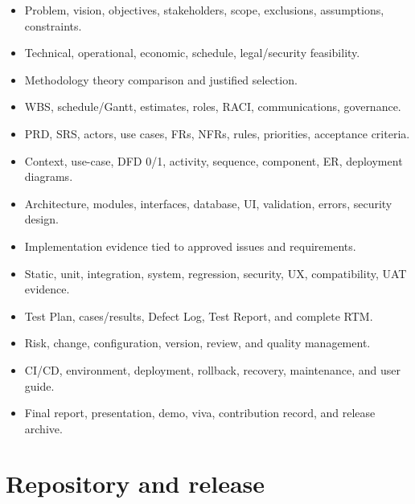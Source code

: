 \documentclass[
  10pt,
  a4paper,
  oneside]{report}
\providecommand{\tightlist}{%
  \setlength{\itemsep}{0pt}\setlength{\parskip}{0pt}}
\begin{document}
\begin{itemize}
\tightlist
\item[$\square$]
  Problem, vision, objectives, stakeholders, scope, exclusions,
  assumptions, constraints.
\item[$\square$]
  Technical, operational, economic, schedule, legal/security
  feasibility.
\item[$\square$]
  Methodology theory comparison and justified selection.
\item[$\square$]
  WBS, schedule/Gantt, estimates, roles, RACI, communications,
  governance.
\item[$\square$]
  PRD, SRS, actors, use cases, FRs, NFRs, rules, priorities, acceptance
  criteria.
\item[$\square$]
  Context, use-case, DFD 0/1, activity, sequence, component, ER,
  deployment diagrams.
\item[$\square$]
  Architecture, modules, interfaces, database, UI, validation, errors,
  security design.
\item[$\square$]
  Implementation evidence tied to approved issues and requirements.
\item[$\square$]
  Static, unit, integration, system, regression, security, UX,
  compatibility, UAT evidence.
\item[$\square$]
  Test Plan, cases/results, Defect Log, Test Report, and complete RTM.
\item[$\square$]
  Risk, change, configuration, version, review, and quality management.
\item[$\square$]
  CI/CD, environment, deployment, rollback, recovery, maintenance, and
  user guide.
\item[$\square$]
  Final report, presentation, demo, viva, contribution record, and
  release archive.
\end{itemize}

\section{Repository and release}\label{272-repository-and-release}
\end{document}
